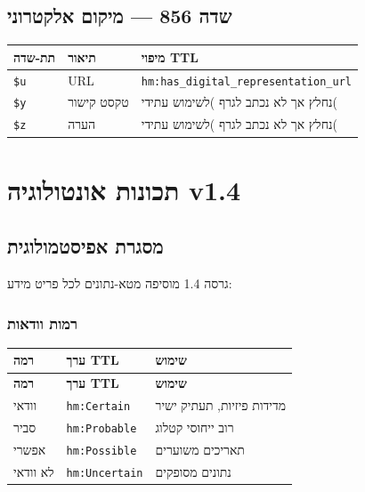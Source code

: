 \documentclass[12pt,a4paper]{article}
\newcommand{\marcfield}[1]{\texttt{#1}}
\newcommand{\ttlprop}[1]{\texttt{#1}}
\begin{document}
\subsection{שדה 856 — מיקום אלקטרוני}

\begin{longtable}{|L{2.5cm}|p{4.5cm}|L{9cm}|}
\hline
\textbf{תת-שדה} & \textbf{תיאור} & \textbf{מיפוי TTL} \\
\hline
\marcfield{\$u} & URL & \ttlprop{hm:has\_digital\_representation\_url} \\
\hline
\marcfield{\$y} & טקסט קישור & נחלץ אך לא נכתב לגרף )לשימוש עתידי( \\
\hline
\marcfield{\$z} & הערה & נחלץ אך לא נכתב לגרף )לשימוש עתידי( \\
\hline
\end{longtable}

\newpage
\section{תכונות אונטולוגיה v1.4}

\subsection{מסגרת אפיסטמולוגית}

גרסה 1.4 מוסיפה מטא-נתונים לכל פריט מידע:

\subsubsection{רמות וודאות}

\begin{longtable}{|p{3cm}|L{5cm}|L{8cm}|}
\hline
\textbf{רמה} & \textbf{ערך TTL} & \textbf{שימוש} \\
\hline
\endfirsthead
\hline
\textbf{רמה} & \textbf{ערך TTL} & \textbf{שימוש} \\
\hline
\endhead
\hline
\endfoot
וודאי & \ttlprop{hm:Certain} & מדידות פיזיות, תעתיק ישיר \\
\hline
סביר & \ttlprop{hm:Probable} & רוב ייחוסי קטלוג \\
\hline
אפשרי & \ttlprop{hm:Possible} & תאריכים משוערים \\
\hline
לא וודאי & \ttlprop{hm:Uncertain} & נתונים מסופקים \\
\hline
\end{longtable}
\end{document}
